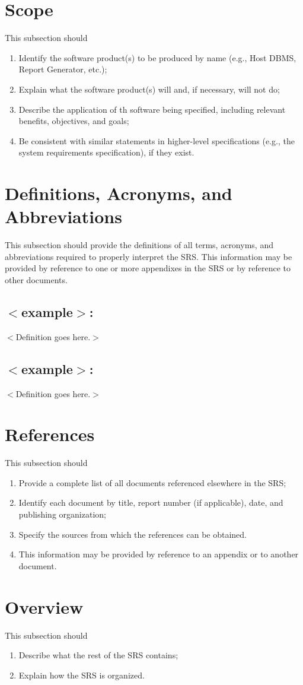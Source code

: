 \documentclass{scrreprt}
\newcommand{\term}{\subsection}
\begin{document}
\section{Scope}
This subsection should
\begin{enumerate}
	\item Identify the software product(s) to be produced by name (e.g., Host
		DBMS, Report Generator, etc.);
	\item Explain what the software product(s) will and, if necessary, will not
		do;
	\item Describe the application of th software being specified, including
		relevant benefits, objectives, and goals;
	\item Be consistent with similar statements in higher-level specifications
		(e.g., the system requirements specification), if they exist.
\end{enumerate}

\section{Definitions, Acronyms, and Abbreviations}
This subsection should provide the definitions of all terms, acronyms, and
abbreviations required to properly interpret the SRS. This information may be
provided by reference to one or more appendixes in the SRS or by reference to
other documents.
\term{$<$example$>$:}
$<$Definition goes here.$>$

\term{$<$example$>$:}
$<$Definition goes here.$>$

\section{References}
This subsection should
\begin{enumerate}
	\item Provide a complete list of all documents referenced elsewhere in the SRS;
	\item Identify each document by title, report number (if applicable), date,
		and publishing organization;
	\item Specify the sources from which the references can be obtained.
	\item This information may be provided by reference to an appendix or to
		another document.
\end{enumerate}

\section{Overview}
This subsection should
\begin{enumerate}
	\item Describe what the rest of the SRS contains;
	\item Explain how the SRS is organized.
\end{enumerate}
\end{document}
